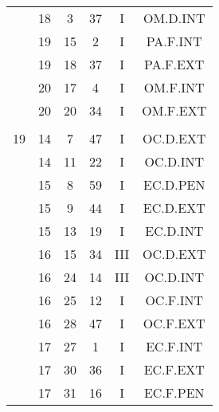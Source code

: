 \documentclass[12pt, a4paper]{article}
\begin{document}
\begin{multicols}{3}
{\begin{tabular}{c c c c c c}
	 	 	 	 & 18 & 3 & 37 & I & OM.D.INT\\%
	 	 	 	 & 19 & 15 & 2 & I & PA.F.INT\\%
	 	 	 	 & 19 & 18 & 37 & I & PA.F.EXT\\%
	 	 	 	 & 20 & 17 & 4 & I & OM.F.INT\\%
	 	 	 	 & 20 & 20 & 34 & I & OM.F.EXT\\%
	 	 	 	 & & & & & \\%
	 	 	 	19 & 14 & 7 & 47 & I & OC.D.EXT\\%
	 	 	 	 & 14 & 11 & 22 & I & OC.D.INT\\%
	 	 	 	 & 15 & 8 & 59 & I & EC.D.PEN\\%
	 	 	 	 & 15 & 9 & 44 & I & EC.D.EXT\\%
	 	 	 	 & 15 & 13 & 19 & I & EC.D.INT\\%
	 	 	 	 & 16 & 15 & 34 & III & OC.D.EXT\\%
	 	 	 	 & 16 & 24 & 14 & III & OC.D.INT\\%
	 	 	 	 & 16 & 25 & 12 & I & OC.F.INT\\%
	 	 	 	 & 16 & 28 & 47 & I & OC.F.EXT\\%
	 	 	 	 & 17 & 27 & 1 & I & EC.F.INT\\%
	 	 	 	 & 17 & 30 & 36 & I & EC.F.EXT\\%
	 	 	 	 & 17 & 31 & 16 & I & EC.F.PEN\\%
	 	 \end{tabular}
 	}
\end{multicols}
\end{document}
